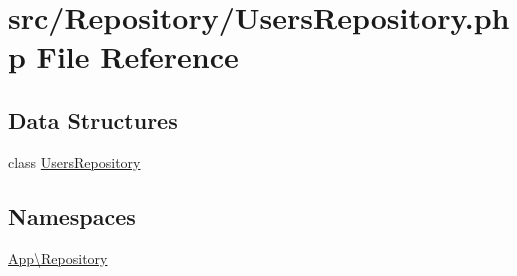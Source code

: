 \hypertarget{_users_repository_8php}{}\section{src/\+Repository/\+Users\+Repository.php File Reference}
\label{_users_repository_8php}
\subsection*{Data Structures}
\begin{DoxyCompactItemize}
\item 
class \mbox{\hyperlink{class_app_1_1_repository_1_1_users_repository}{Users\+Repository}}
\end{DoxyCompactItemize}
\subsection*{Namespaces}
\begin{DoxyCompactItemize}
\item 
 \mbox{\hyperlink{namespace_app_1_1_repository}{App\textbackslash{}\+Repository}}
\end{DoxyCompactItemize}
